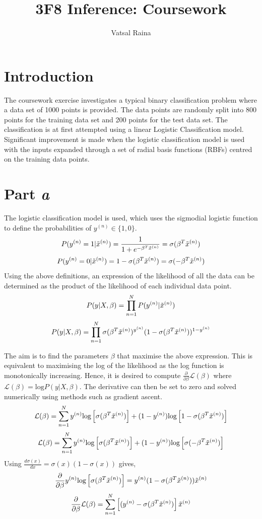 \documentclass[twocolumn]{article}
\title{3F8 Inference: Coursework}
\author{Vatsal Raina}
\begin{document}
\maketitle        

\section{Introduction}

The coursework exercise investigates a typical binary classification problem where a data set of 1000 points is provided. The data points are randomly split into 800 points for the training data set and 200 points for the test data set. The classification is at first attempted using a linear Logistic Classification model. Significant improvement is made when the logistic classification model is used with the inputs expanded through a set of radial basis functions (RBFs) centred on the training data points.

\section{Part \textit{a}}

The logistic classification model is used, which uses the sigmodial logistic function to define the probabilities of $y^{(n)}\in\{1,0\}$.
$$ P(y^{(n)}=1|\Tilde{x}^{(n)})=\frac{1}{1+e^{-\beta^T\Tilde{x}^{(n)}}}=\sigma(\beta^T\Tilde{x}^{(n)}) $$
$$ P(y^{(n)}=0|\Tilde{x}^{(n)})= 1- \sigma(\beta^T\Tilde{x}^{(n)})=\sigma(-\beta^T\Tilde{x}^{(n)})$$
Using the above definitions, an expression of the likelihood of all the data can be determined as the product of the likelihood of each individual data point.
$$P(y|X,\beta)=\prod_{n=1}^N P(y^{(n)}|\Tilde{x}^{(n)}) $$
$$P(y|X,\beta) = \prod_{n=1}^N \sigma(\beta^T\Tilde{x}^{(n)})^{y^{(n)}}(1-\sigma(\beta^T\Tilde{x}^{(n)}))^{1-y^{(n)}}$$

The aim is to find the parameters $\beta$ that maximise the above expression. This is equivalent to maximising the log of the likelihood as the log function is monotonically increasing. Hence, it is desired to compute $\frac{\partial}{\partial \beta}\mathcal{L}(\beta)$ where $\mathcal{L}(\beta)=\text{log}P(y|X,\beta)$. The derivative can then be set to zero and solved numerically using methods such as gradient ascent.
$$\mathcal{L}(\beta)=\sum_{n=1}^N y^{(n)}\text{log}\left[\sigma(\beta^T\Tilde{x}^{(n)})\right]+(1-y^{(n)})\text{log}\left[1-\sigma(\beta^T\Tilde{x}^{(n)})\right]$$
$$\mathcal{L}(\beta)=\sum_{n=1}^N y^{(n)}\text{log}\left[\sigma(\beta^T\Tilde{x}^{(n)})\right]+(1-y^{(n)})\text{log}\left[\sigma(-\beta^T\Tilde{x}^{(n)})\right]$$
Using $\frac{d\sigma (x)}{dx}=\sigma(x)(1-\sigma(x))$ gives,
$$\frac{\partial}{\partial \beta}y^{(n)}\text{log}\left[\sigma(\beta^T\Tilde{x}^{(n)})\right]=y^{(n)}(1-\sigma(\beta^T\Tilde{x}^{(n)}))\Tilde{x}^{(n)}$$
$$\frac{\partial}{\partial \beta}\mathcal{L}(\beta)=\sum_{n=1}^N\left[(y^{(n)}-\sigma(\beta^T\Tilde{x}^{(n)})\right]\Tilde{x}^{(n)}$$
\end{document}
